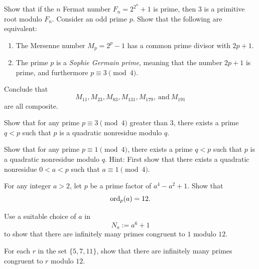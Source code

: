 \begin{challenge}
  \exercise Show that if the $n$\supth{} Fermat number $F_n=2^{2^n}+1$ is prime, then $3$ is a primitive root modulo $F_n$.
  \exercise Consider an odd prime $p$. Show that the following are equivalent:
  \begin{enumerate}
  \item The Mersenne number $M_p=2^p-1$ has a common prime divisor with $2p+1$.
  \item The prime $p$ is a \emph{Sophie Germain prime}, meaning that the number $2p+1$ is prime, and furthermore $p\equiv 3\pmod{4}$.
  \end{enumerate}
  Conclude that
  \begin{equation*}
    M_{11},M_{23},M_{83},M_{131},M_{179},~\text{and}~M_{191}
  \end{equation*}
  are all composite.
  \exercise
  \begin{subexenum}
  \item Show that for any prime $p\equiv 3\pmod{4}$ greater than $3$, there exists a prime $q<p$ such that $p$ is a quadratic nonresidue modulo $q$.
  \item Show that for any prime $p\equiv 1\pmod{4}$, there exists a prime $q<p$ such that $p$ is a quadratic nonresidue modulo $q$. Hint: First show that there exists a quadratic nonresidue $0<a<p$ such that $a\equiv 1\pmod{4}$.
  \end{subexenum}
  \exercise
  \begin{subexenum}
  \item For any integer $a>2$, let $p$ be a prime factor of $a^4-a^2+1$. Show that
    \begin{equation*}
      \operatorname{ord}_p(a)=12.
    \end{equation*}
  \item Use a suitable choice of $a$ in
    \begin{equation*}
      N_a:=a^6+1
    \end{equation*}
    to show that there are infinitely many primes congruent to $1$ modulo $12$.
  \item For each $r$ in the set $\{5,7,11\}$, show that there are infinitely many primes congruent to $r$ modulo $12$.    
  \end{subexenum}
\end{challenge}


